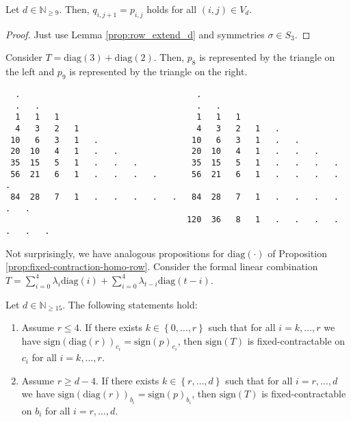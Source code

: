\begin{lemma}\label{prop:diag_extend_d}
    Let \( d \in \mathbb{N}_{\geq 9} \). Then, \( q_{i,j+1} = p_{i,j} \) holds for all \( (i,j) \in V_d \).
\end{lemma}

\begin{proof}
    Just use Lemma \ref{prop:row_extend_d} and symmetries \( \sigma \in S_3 \).
\end{proof}

\begin{example}
    Consider \( T = \mathrm{diag}(3) + \mathrm{diag}(2) \). Then, \( p_8 \) is represented by the triangle on the left and \( p_9 \) is represented by the triangle on the right.
    \begin{verbatim}
  .                                    .  
  .   .                                .   .  
  1   1   1                            1   1   1   
  4   3   2   1                        4   3   2   1   .
 10   6   3   1   .                   10   6   3   1   .   .
 20  10   4   1   .   .               20  10   4   1   .   .   .
 35  15   5   1   .   .   .           35  15   5   1   .   .   .   .
 56  21   6   1   .   .   .   .       56  21   6   1   .   .   .   .   .
 84  28   7   1   .   .   .   .   .   84  28   7   1   .   .   .   .   .   .
                                     120  36   8   1   .   .   .   .   .   .   . 
\end{verbatim}
\end{example}

Not surprisingly, we have analogous propositions for \( \mathrm{diag}(\cdot) \) of Proposition \ref{prop:fixed-contraction-homo-row}. Consider the formal linear combination \(  T = \sum_{i=0}^{4}  \lambda_{i} \mathrm{diag}(i) + \sum_{i=0}^{4}  \lambda_{t-i} \mathrm{diag}(t-i) \).

\begin{proposition}\label{prop:fixed-contraction-homo-diag}
    Let \( d \in \mathbb{N}_{\geq 15} \). The following statements hold:
    \begin{enumerate}
        \item  Assume \( r \leq 4 \). If there exists \( k \in \left\{ 0, \dots, r \right\} \) such that for all \( i = k, \dots, r\) we have \(  \mathrm{sign}(\mathrm{diag}(r))_{c_i} = \mathrm{sign}(p)_{c_i} \),
        then  \( \mathrm{sign}(T) \) is fixed-contractable on \( c_i \) for all \( i = k, \dots, r \).
        \item Assume \( r \geq d-4 \).
        If there exists \( k \in \left\{ r, \dots, d \right\} \) such that for all \( i = r, \dots, d\) we have \(  \mathrm{sign}(\mathrm{diag}(r))_{b_i} = \mathrm{sign}(p)_{b_i} \),
        then  \( \mathrm{sign}(T) \) is fixed-contractable on \( b_i \) for all \( i = r, \dots, d \).
    \end{enumerate}
\end{proposition}

